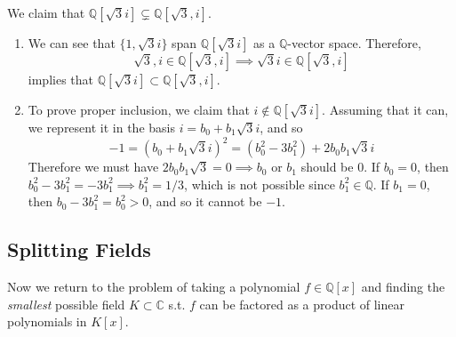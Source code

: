  \begin{example}
    We claim that $\mathbb{Q}[\sqrt{3} i] \subsetneq \mathbb{Q}[\sqrt{3}, i]$. 
    \begin{enumerate}
      \item We can see that $\{1, \sqrt{3}i \}$ span $\mathbb{Q}[\sqrt{3}i ]$ as a $\mathbb{Q}$-vector space. Therefore, 
      \begin{equation}
        \sqrt{3}, i \in \mathbb{Q}[\sqrt{3}, i] \implies \sqrt{3} i \in \mathbb{Q}[\sqrt{3}, i]
      \end{equation} 
      implies that $\mathbb{Q}[\sqrt{3} i] \subset \mathbb{Q}[\sqrt{3}, i]$. 

      \item To prove proper inclusion, we claim that $i \not\in \mathbb{Q}[\sqrt{3}i]$. Assuming that it can, we represent it in the basis $i = b_0 + b_1 \sqrt{3} i$, and so
      \begin{equation}
        -1 = (b_0 + b_1 \sqrt{3} i)^2 = (b_0^2 - 3b_1^2) + 2b_0 b_1 \sqrt{3} i
      \end{equation}
      Therefore we must have $2b_0 b_1 \sqrt{3} = 0 \implies b_0$ or $b_1$ should be $0$. If $b_0 = 0$, then $b_0^2 - 3b_1^2 = -3 b_1^2 \implies b_1^2 = 1/3$, which is not possible since $b_1^2 \in \mathbb{Q}$. If $b_1 = 0$, then $b_0 - 3 b_1^2 = b_0^2 > 0$, and so it cannot be $-1$. 
    \end{enumerate}
  \end{example}

\subsection{Splitting Fields}

  Now we return to the problem of taking a polynomial $f \in \mathbb{Q}[x]$ and finding the \textit{smallest} possible field $K \subset \mathbb{C}$ s.t. $f$ can be factored as a product of linear polynomials in $K[x]$. 

